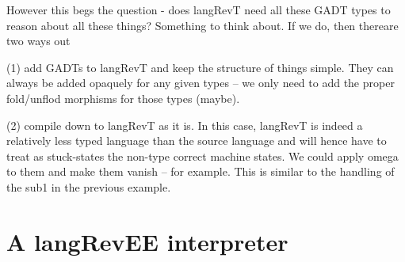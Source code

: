 \documentclass{llncs}
\begin{document}
%
%
%


However this begs the question - does {{langRevT}} need all these GADT
types to reason about all these things? Something to think about. If
we do, then thereare two ways out 

(1) add GADTs to {{langRevT}} and keep the structure of things
simple. They can always be added opaquely for any given types -- we
only need to add the proper fold/unflod morphisms for those types
(maybe).

(2) compile down to {{langRevT}} as it is. In this case, {{langRevT}}
is indeed a relatively less typed language than the source language
and will hence have to treat as stuck-states the non-type correct
machine states. We could apply omega to them and make them vanish --
for example. This is similar to the handling of the {{sub1}} in the
previous example. 



\section{A {{langRevEE}} interpreter}

%
%
\end{document}
